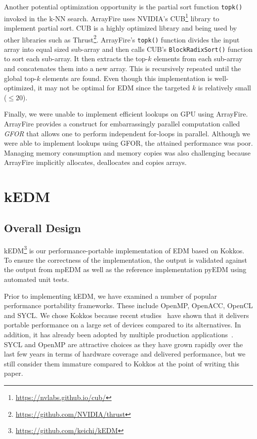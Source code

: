 \documentclass[conference]{IEEEtran}
\begin{document}
Another potential optimization opportunity is the partial sort function
\texttt{topk()} invoked in the k-NN search. ArrayFire uses NVIDIA's
CUB\footnote{\url{https://nvlabs.github.io/cub/}} library to implement partial
sort. CUB is a highly optimized library and being used by other libraries such
as Thrust\footnote{\url{https://github.com/NVIDIA/thrust}}. ArrayFire's
\texttt{topk()} function divides the input array into equal sized sub-array
and then calls CUB's \texttt{BlockRadixSort()} function to sort each
sub-array. It then extracts the top-$k$ elements from each sub-array and
concatenates them into a new array. This is recursively repeated until the
global top-$k$ elements are found. Even though this implementation is
well-optimized, it may not be optimal for EDM since the targeted $k$ is
relatively small ($\leq 20$).

Finally, we were unable to implement efficient lookups on GPU using ArrayFire.
ArrayFire provides a construct for embarrassingly parallel computation called
\textit{GFOR} that allows one to perform independent for-loops in parallel.
Although we were able to implement lookups using GFOR, the attained
performance was poor. Managing memory consumption and memory copies was also
challenging because ArrayFire implicitly allocates, deallocates and copies
arrays.

\section{kEDM}\label{sec:proposal}

\subsection{Overall Design}

kEDM\footnote{\url{https://github.com/keichi/kEDM}} is our
performance-portable implementation of EDM based on Kokkos. To ensure the
correctness of the implementation, the output is validated against the output
from mpEDM as well as the reference implementation pyEDM using automated unit
tests.

Prior to implementing kEDM, we have examined a number of popular performance
portability frameworks. These include OpenMP, OpenACC, OpenCL and SYCL\@. We
chose Kokkos  because recent studies~\cite{Martineau2017, Deakin2019, Deakin2020}
have shown that it delivers portable performance on a large set of devices
compared to its alternatives. In addition, it has already been adopted by
multiple production applications~\cite{Sprague2020,Holmen2017,Demeshko2019}.
SYCL and OpenMP are attractive choices as they have grown rapidly over the
last few years in terms of hardware coverage and delivered performance, but we
still consider them immature compared to Kokkos at the point of writing this
paper.
\end{document}
